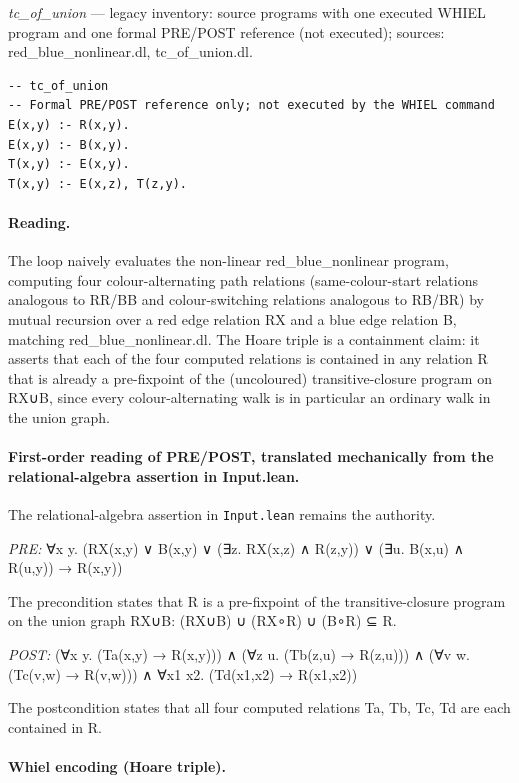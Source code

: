 \documentclass[10pt]{article}
\begin{document}
{\raggedright\textit{tc\_of\_union} --- legacy inventory: source programs with one executed WHIEL program and one formal PRE/POST reference (not executed); sources: red\_blue\_nonlinear.dl, tc\_of\_union.dl.\par}

\begin{Verbatim}[fontsize=\scriptsize,breaklines=true,breakanywhere=true,frame=single,framesep=1.5mm]
-- tc_of_union
-- Formal PRE/POST reference only; not executed by the WHIEL command
E(x,y) :- R(x,y).
E(x,y) :- B(x,y).
T(x,y) :- E(x,y).
T(x,y) :- E(x,z), T(z,y).
\end{Verbatim}

\paragraph{Reading.} The loop naively evaluates the non-linear red\_blue\_nonlinear program, computing four colour-alternating path relations (same-colour-start relations analogous to RR/BB and colour-switching relations analogous to RB/BR) by mutual recursion over a red edge relation RX and a blue edge relation B, matching red\_blue\_nonlinear.dl. The Hoare triple is a containment claim: it asserts that each of the four computed relations is contained in any relation R that is already a pre-fixpoint of the (uncoloured) transitive-closure program on RX∪B, since every colour-alternating walk is in particular an ordinary walk in the union graph.

\paragraph{First-order reading of PRE/POST, translated mechanically from the relational-algebra assertion in Input.lean.} The relational-algebra assertion in \texttt{Input.lean} remains the authority.

\textit{PRE:} ∀x y. (RX(x,y) ∨ B(x,y) ∨ (∃z. RX(x,z) ∧ R(z,y)) ∨ (∃u. B(x,u) ∧ R(u,y)) → R(x,y))\par The precondition states that R is a pre-fixpoint of the transitive-closure program on the union graph RX∪B: (RX∪B) ∪ (RX∘R) ∪ (B∘R) ⊆ R.

\textit{POST:} (∀x y. (Ta(x,y) → R(x,y))) ∧ (∀z u. (Tb(z,u) → R(z,u))) ∧ (∀v w. (Tc(v,w) → R(v,w))) ∧ ∀x1 x2. (Td(x1,x2) → R(x1,x2))\par The postcondition states that all four computed relations Ta, Tb, Tc, Td are each contained in R.

\paragraph{Whiel encoding (Hoare triple).}
\end{document}
